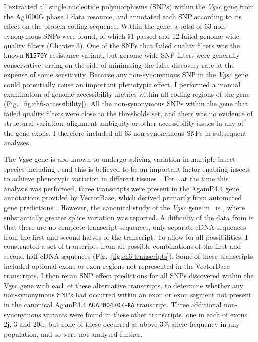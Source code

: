 \begin{refsection}
I extracted all single nucleotide polymorphisms (SNPs) within the \textit{Vgsc} gene from the Ag1000G phase 1 data resource, and annotated each SNP according to its effect on the protein coding sequence.
%
Within the gene, a total of 63 non-synonymous SNPs were found, of which 51 passed and 12 failed genome-wide quality filters (Chapter 3).
%
One of the SNPs that failed quality filters was the known \texttt{N1570Y} resistance variant, but genome-wide SNP filters were generally conservative, erring on the side of minimising the false discovery rate at the expense of some sensitivity.
%
Because any non-synonymous SNP in the \textit{Vgsc} gene could potentially cause an important phenotypic effect, I performed a manual examination of genome accessibility metrics within all coding regions of the gene (Fig.~\ref{fig:ch6-accessibility}).
%
All the non-synonymous SNPs within the gene that failed quality filters were close to the thresholds set, and there was no evidence of structural variation, alignment ambiguity or other accessibility issues in any of the gene exons.
%
I therefore included all 63 non-synonymous SNPs in subsequent analyses.


The Vgsc gene is also known to undergo splicing variation in multiple insect species including \agam, and this is believed to be an important factor enabling insects to achieve phenotypic variation in different tissues~\parencite{Dong2014,Davies2007}.
%
For \agam, at the time this analysis was performed, three transcripts were present in the AgamP4.4 gene annotations provided by VectorBase, which derived primarily from automated gene predictions~\parencite{Curwen2004}.
%
However, the canonical study of the \textit{Vgsc} gene in \agam\ is \textcite{Davies2007}, where substantially greater splice variation was reported.
%
A difficulty of the data from \textcite{Davies2007} is that there are no complete transcript sequences, only separate cDNA sequences from the first and second halves of the transcript.
%
To allow for all possibilities, I constructed a set of transcripts from all possible combinations of the first and second half cDNA sequences (Fig.~\ref{fig:ch6-transcripts}).
%
Some of these transcripts included optional exons or exon regions not represented in the VectorBase transcripts.
%
I then reran SNP effect predictions for all SNPs discovered within the Vgsc gene with each of these alternative transcripts, to determine whether any non-synonymous SNPs had occurred within an exon or exon segment not present in the canonical AgamP4.4 \texttt{AGAP004707-RA} transcript.
%
Three additional non-synonymous variants were found in these other transcripts, one in each of exons 2j, 3 and 20d, but none of these occurred at above 3\% allele frequency in any population, and so were not analysed further.



\end{refsection}
